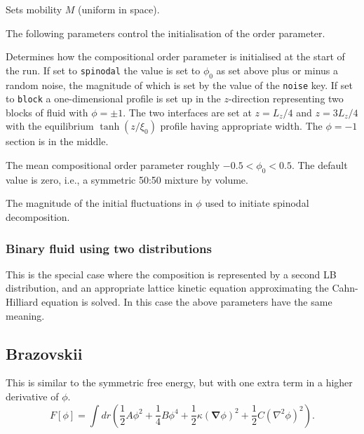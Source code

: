  Sets mobility $M$ (uniform in space).

The following parameters control the initialisation of the order
parameter.


Determines how the compositional order parameter is initialised
at the start of the run. If set to \texttt{spinodal} the value
is set to $\phi_0$ as set above plus or minus a random noise, the
magnitude of which is set by the value of the \texttt{noise} key.
If set to \texttt{block} a one-dimensional profile is set up in
the $z$-direction representing two blocks of fluid with
$\phi = \pm 1$. The two interfaces are set at $z = L_z/4$ and
$z = 3L_z/4$ with the equilibrium $\tanh(z/\xi_0)$ profile having 
appropriate width. The $\phi = -1$ section is in the middle.


The mean compositional order parameter roughly $-0.5 < \phi_0 < 0.5$.
The default value is zero, i.e., a symmetric 50:50 mixture by volume.


The magnitude of the initial fluctuations in $\phi$ used to
initiate spinodal decomposition.

\subsubsection{Binary fluid using two distributions}


This is the special case where the composition is represented
by a second LB distribution, and an appropriate lattice kinetic
equation approximating the Cahn-Hilliard equation is solved.
In this case the above parameters have the same meaning.


\subsection{Brazovskii}


This is similar to the symmetric free energy, but with one extra term
in a higher derivative of $\phi$.
\begin{equation}
 F[\phi] = 
\int dr \left(
{\textstyle \frac{1}{2}}A\phi^2
+ {\textstyle \frac{1}{4}}B\phi^4
+ {\textstyle \frac{1}{2}}\kappa (\mathbf{\nabla}\phi)^2
+ {\textstyle \frac{1}{2}} C (\nabla^2 \phi)^2 \right).
\end{equation}

